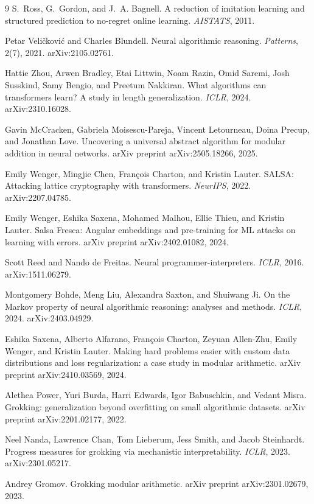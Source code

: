 \documentclass[11pt]{article}
\begin{document}
\begin{thebibliography}{9}
 S.~Ross, G.~Gordon, and J.~A. Bagnell. A reduction of imitation learning and structured prediction to no-regret online learning. \emph{AISTATS}, 2011.

 Petar Veli\v{c}kovi\'c and Charles Blundell. Neural algorithmic reasoning. \emph{Patterns}, 2(7), 2021. arXiv:2105.02761.

 Hattie Zhou, Arwen Bradley, Etai Littwin, Noam Razin, Omid Saremi, Josh Susskind, Samy Bengio, and Preetum Nakkiran. What algorithms can transformers learn? A study in length generalization. \emph{ICLR}, 2024. arXiv:2310.16028.

 Gavin McCracken, Gabriela Moisescu-Pareja, Vincent Letourneau, Doina Precup, and Jonathan Love. Uncovering a universal abstract algorithm for modular addition in neural networks. arXiv preprint arXiv:2505.18266, 2025.

 Emily Wenger, Mingjie Chen, Fran\c{c}ois Charton, and Kristin Lauter. SALSA: Attacking lattice cryptography with transformers. \emph{NeurIPS}, 2022. arXiv:2207.04785.

 Emily Wenger, Eshika Saxena, Mohamed Malhou, Ellie Thieu, and Kristin Lauter. Salsa Fresca: Angular embeddings and pre-training for ML attacks on learning with errors. arXiv preprint arXiv:2402.01082, 2024.

 Scott Reed and Nando de Freitas. Neural programmer-interpreters. \emph{ICLR}, 2016. arXiv:1511.06279.

 Montgomery Bohde, Meng Liu, Alexandra Saxton, and Shuiwang Ji. On the Markov property of neural algorithmic reasoning: analyses and methods. \emph{ICLR}, 2024. arXiv:2403.04929.

 Eshika Saxena, Alberto Alfarano, Fran\c{c}ois Charton, Zeyuan Allen-Zhu, Emily Wenger, and Kristin Lauter. Making hard problems easier with custom data distributions and loss regularization: a case study in modular arithmetic. arXiv preprint arXiv:2410.03569, 2024.

 Alethea Power, Yuri Burda, Harri Edwards, Igor Babuschkin, and Vedant Misra. Grokking: generalization beyond overfitting on small algorithmic datasets. arXiv preprint arXiv:2201.02177, 2022.

 Neel Nanda, Lawrence Chan, Tom Lieberum, Jess Smith, and Jacob Steinhardt. Progress measures for grokking via mechanistic interpretability. \emph{ICLR}, 2023. arXiv:2301.05217.

 Andrey Gromov. Grokking modular arithmetic. arXiv preprint arXiv:2301.02679, 2023.

\end{thebibliography}
\end{document}
